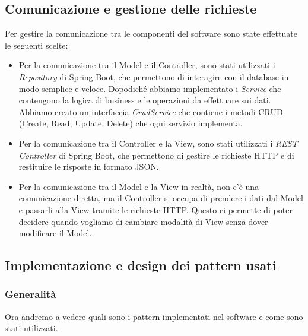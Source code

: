\documentclass[a4paper]{article}
\begin{document}
\subsection{Comunicazione e gestione delle richieste}

Per gestire la comunicazione tra le componenti del software sono state effettuate le seguenti scelte:
\begin{itemize}
  \item Per la comunicazione tra il Model e il Controller, sono stati utilizzati i \textit{Repository} di Spring Boot, 
  che permettono di interagire con il database in modo semplice e veloce. Dopodiché abbiamo implementato
  i \textit{Service} che contengono la logica di business e le operazioni da effettuare sui dati. Abbiamo creato
  un interfaccia \textit{CrudService} che contiene i metodi CRUD (Create, Read, Update, Delete) che ogni servizio implementa.
  \item Per la comunicazione tra il Controller e la View, sono stati utilizzati i \textit{REST Controller} di Spring Boot, 
  che permettono di gestire le richieste HTTP e di restituire le risposte in formato JSON.
  \item Per la comunicazione tra il Model e la View in realtà, non c'è una comunicazione diretta, ma il Controller
  si occupa di prendere i dati dal Model e passarli alla View tramite le richieste HTTP. Questo ci permette 
  di poter decidere quando vogliamo di cambiare modalità di View senza dover modificare il Model.
\end{itemize}

\subsection{Implementazione e design dei pattern usati}

\subsubsection{Generalità}

Ora andremo a vedere quali sono i pattern implementati nel software e come sono stati utilizzati.
\end{document}

